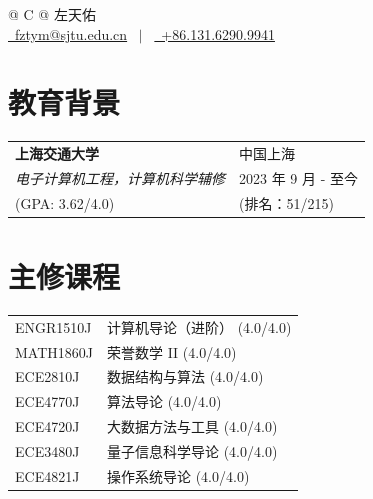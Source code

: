 \documentclass[a4paper,12pt]{article}
\begin{document}
\pagestyle{empty} 


\begin{tabularx}{\linewidth}{@{} C @{}}
\Huge{左天佑} \\[7.5pt]
\href{mailto:fztym@sjtu.edu.cn}{\raisebox{-0.05\height}\faEnvelope \ fztym@sjtu.edu.cn} \ $|$ \ 
\href{tel:+8613162909941}{\raisebox{-0.05\height}\faMobile \ +86.131.6290.9941} \\
\end{tabularx}


\section{教育背景}
\begin{tabularx}{\linewidth}{@{}l X@{}}	
\textbf{上海交通大学} & 中国上海 \\
\textit{电子计算机工程，计算机科学辅修} & 2023 年 9 月 - 至今 \\  
\normalsize (GPA: 3.62/4.0) & (排名：51/215)\\
\end{tabularx}


\section{主修课程}
\begin{tabularx}{\linewidth}{@{}l X@{}}	
ENGR1510J & 计算机导论（进阶） \hfill \normalsize (4.0/4.0)\\
MATH1860J & 荣誉数学 II \hfill \normalsize (4.0/4.0)\\
ECE2810J & 数据结构与算法 \hfill \normalsize (4.0/4.0)\\
ECE4770J & 算法导论 \hfill \normalsize (4.0/4.0)\\
ECE4720J & 大数据方法与工具 \hfill \normalsize (4.0/4.0)\\
ECE3480J & 量子信息科学导论 \hfill \normalsize (4.0/4.0) \\
ECE4821J & 操作系统导论 \hfill \normalsize (4.0/4.0)
\end{tabularx}
\end{document}
